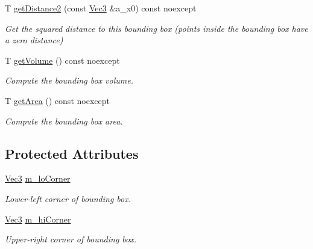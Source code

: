 \begin{DoxyCompactItemize}
T \hyperlink{classBoundingVolumes_1_1AABBT_a2196f1cf735ccf5d1f5c1ee8dcb449dd}{get\+Distance2} (const \hyperlink{classBoundingVolumes_1_1AABBT_aa968c6b21a7f02e1cbfc03d26c7e67b4}{Vec3} \&a\+\_\+x0) const noexcept
\begin{DoxyCompactList}\small\item\em Get the squared distance to this bounding box (points inside the bounding box have a zero distance) \end{DoxyCompactList}\item 
\mbox{\label{classBoundingVolumes_1_1AABBT_ac5b8f2caa8afe1177f3d2924fbc3f7a5}} 
T \hyperlink{classBoundingVolumes_1_1AABBT_ac5b8f2caa8afe1177f3d2924fbc3f7a5}{get\+Volume} () const noexcept
\begin{DoxyCompactList}\small\item\em Compute the bounding box volume. \end{DoxyCompactList}\item 
\mbox{\label{classBoundingVolumes_1_1AABBT_ae2f3ba3dde664cccd7c46b0ef4f087d6}} 
T \hyperlink{classBoundingVolumes_1_1AABBT_ae2f3ba3dde664cccd7c46b0ef4f087d6}{get\+Area} () const noexcept
\begin{DoxyCompactList}\small\item\em Compute the bounding box area. \end{DoxyCompactList}\end{DoxyCompactItemize}
\subsection*{Protected Attributes}
\begin{DoxyCompactItemize}
\item 
\mbox{\label{classBoundingVolumes_1_1AABBT_a5cbd0ee374c62951aa58644bc09f70cf}} 
\hyperlink{classBoundingVolumes_1_1AABBT_aa968c6b21a7f02e1cbfc03d26c7e67b4}{Vec3} \hyperlink{classBoundingVolumes_1_1AABBT_a5cbd0ee374c62951aa58644bc09f70cf}{m\+\_\+lo\+Corner}
\begin{DoxyCompactList}\small\item\em Lower-\/left corner of bounding box. \end{DoxyCompactList}\item 
\mbox{\label{classBoundingVolumes_1_1AABBT_a35f9498191e406b3f48f7454bfdf0cf7}} 
\hyperlink{classBoundingVolumes_1_1AABBT_aa968c6b21a7f02e1cbfc03d26c7e67b4}{Vec3} \hyperlink{classBoundingVolumes_1_1AABBT_a35f9498191e406b3f48f7454bfdf0cf7}{m\+\_\+hi\+Corner}
\begin{DoxyCompactList}\small\item\em Upper-\/right corner of bounding box. \end{DoxyCompactList}\end{DoxyCompactItemize}


